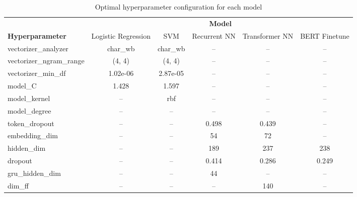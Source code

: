 \begin{table}[!ht]
\centering
\small

\begin{tabular}{lccccc}
\toprule
& \multicolumn{5}{c}{\textbf{Model}} \\
 \cmidrule(lr){2-6} 
\textbf{Hyperparameter} & Logistic Regression & SVM & Recurrent NN & Transformer NN & BERT Finetune \\
\midrule

vectorizer\_analyzer & char\_wb & char\_wb & -- & -- & -- \\
vectorizer\_ngram\_range & (4, 4) & (4, 4) & -- & -- & -- \\
vectorizer\_min\_df & 1.02e-06 & 2.87e-05 & -- & -- & -- \\
model\_C & 1.428 & 1.597 & -- & -- & -- \\
model\_kernel & -- & rbf & -- & -- & -- \\
model\_degree & -- & -- & -- & -- & -- \\
\midrule
token\_dropout & -- & -- & 0.498 & 0.439 & -- \\
embedding\_dim & -- & -- & 54 & 72 & -- \\
hidden\_dim & -- & -- & 189 & 237 & 238 \\
dropout & -- & -- & 0.414 & 0.286 & 0.249 \\
gru\_hidden\_dim & -- & -- & 44 & -- & -- \\
dim\_ff & -- & -- & -- & 140 & -- \\

\bottomrule
\end{tabular}
\caption{Optimal hyperparameter configuration for each model}
\label{table-optimal-hparams}
\end{table}